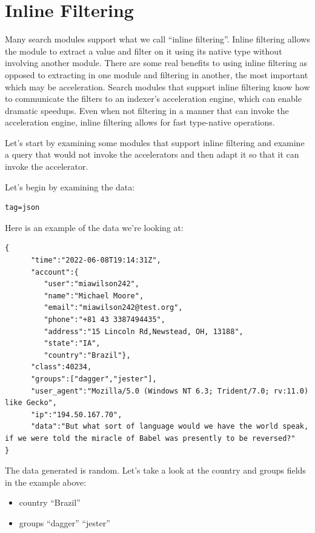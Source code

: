 \clearpage
\section{Inline Filtering}
Many search modules support what we call ``inline filtering''. Inline
filtering allows the module to extract a value and filter on it using
its native type without involving another module. There are some real
benefits to using inline filtering as opposed to extracting in one
module and filtering in another, the most important which may be
acceleration. Search modules that support inline filtering know how to
communicate the filters to an indexer's acceleration engine, which can
enable dramatic speedups. Even when not filtering in a manner that can
invoke the acceleration engine, inline filtering allows for fast type-native operations.

Let's start by examining some modules that support inline filtering and
examine a query that would not invoke the accelerators and then adapt it
so that it can invoke the accelerator. 

Let's begin by examining the data:

\begin{Verbatim}
tag=json
\end{Verbatim}

Here is an example of the data we're looking at:

\begin{Verbatim}[breaklines=true]
{
      "time":"2022-06-08T19:14:31Z",
      "account":{
         "user":"miawilson242",
         "name":"Michael Moore",
         "email":"miawilson242@test.org",
         "phone":"+81 43 3387494435",
         "address":"15 Lincoln Rd,Newstead, OH, 13188", 
         "state":"IA",
         "country":"Brazil"},
      "class":40234,
      "groups":["dagger","jester"],
      "user_agent":"Mozilla/5.0 (Windows NT 6.3; Trident/7.0; rv:11.0) like Gecko",
      "ip":"194.50.167.70",
      "data":"But what sort of language would we have the world speak, if we were told the miracle of Babel was presently to be reversed?"
}
\end{Verbatim}

The data generated is random. Let's take a look at the country and groups fields in the example above:

\begin{itemize}
\item country
\subitem ``Brazil''
\item groups
\subitem ``dagger''
\subitem ``jester''
\end{itemize}

